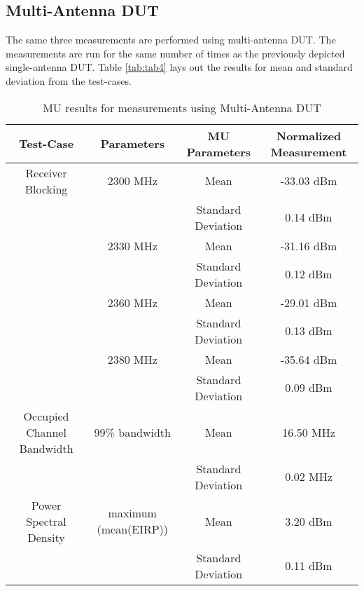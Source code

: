 \subsection{Multi-Antenna \acs{DUT}}
The same three measurements are performed using multi-antenna \acs{DUT}. The measurements are run for the same number of times as the previously depicted single-antenna \acs{DUT}. Table \ref{tab:tab4} lays out the results for mean and standard deviation from the test-cases.
\begin{table}[H]
\resizebox{\textwidth}{!}
{
        \begin{tabular}{|c|c|c|c|}\toprule
         \textbf{Test-Case} & Parameters & \textbf{MU Parameters} & \textbf{Normalized Measurement} \\
            \midrule
           Receiver Blocking & 2300 MHz & Mean     & -33.03 dBm \\
                         &    & Standard Deviation & 0.14 dBm     \\

          &  2330 MHz & Mean     & -31.16 dBm       \\
                     &        & Standard Deviation & 0.12 dBm    \\

          &  2360 MHz & Mean       & -29.01 dBm    \\
                          &   & Standard Deviation & 0.13 dBm      \\
                           
          &  2380 MHz & Mean      & -35.64 dBm    \\
                       &      & Standard Deviation & 0.09 dBm     \\
                       \midrule
                      
          Occupied Channel Bandwidth & 99\% bandwidth & Mean & 16.50 MHz \\
           &  & Standard Deviation & 0.02 MHz \\
           
           \midrule
           Power Spectral Density &   maximum (mean(EIRP)) & Mean &  3.20 dBm \\
           & & Standard Deviation & 0.11 dBm \\          
           \bottomrule
        \end{tabular}}
        \caption{\acf{MU} results for measurements using Multi-Antenna \acs{DUT}}\label{tab:Tab4}
 \end{table} 


